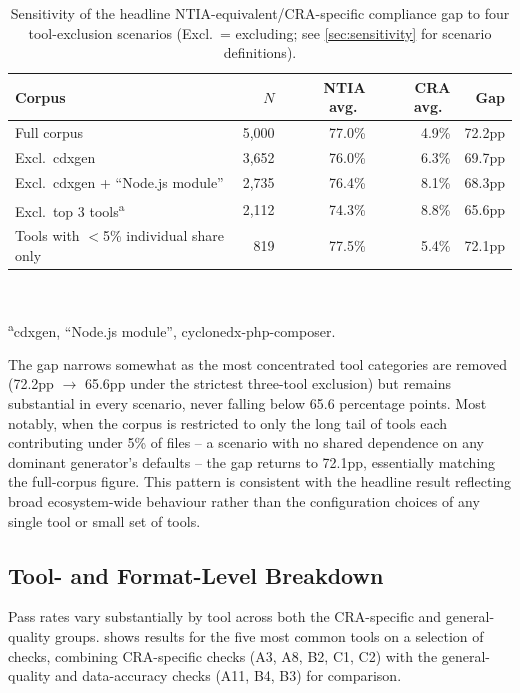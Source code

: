 \documentclass[11pt]{article}
\begin{document}
\begin{table}[t]
\centering
\caption{Sensitivity of the headline NTIA-equivalent/CRA-specific compliance gap to four tool-exclusion scenarios (Excl.\ = excluding; see \cref{sec:sensitivity} for scenario definitions).}
\label{tab:sensitivity}
\begin{tabular}{lrrrr}
\toprule
Corpus & $N$ & NTIA avg.\ & CRA avg.\ & Gap \\
\midrule
Full corpus & 5,000 & 77.0\% & 4.9\% & 72.2pp \\
Excl.\ cdxgen & 3,652 & 76.0\% & 6.3\% & 69.7pp \\
Excl.\ cdxgen + ``Node.js module'' & 2,735 & 76.4\% & 8.1\% & 68.3pp \\
Excl.\ top 3 tools\textsuperscript{a} & 2,112 & 74.3\% & 8.8\% & 65.6pp \\
Tools with $<$5\% individual share only & 819 & 77.5\% & 5.4\% & 72.1pp \\
\bottomrule
\end{tabular}
\\[2pt]
\raggedright\footnotesize\textsuperscript{a}cdxgen, ``Node.js module'', cyclonedx-php-composer.
\end{table}

The gap narrows somewhat as the most concentrated tool categories are removed (72.2pp $\rightarrow$ 65.6pp under the strictest three-tool exclusion) but remains substantial in every scenario, never falling below 65.6 percentage points. Most notably, when the corpus is restricted to only the long tail of tools each contributing under 5\% of files -- a scenario with no shared dependence on any dominant generator's defaults -- the gap returns to 72.1pp, essentially matching the full-corpus figure. This pattern is consistent with the headline result reflecting broad ecosystem-wide behaviour rather than the configuration choices of any single tool or small set of tools.

\subsection{Tool- and Format-Level Breakdown}
\label{sec:tool-format}

Pass rates vary substantially by tool across both the CRA-specific and general-quality groups.  shows results for the five most common tools on a selection of checks, combining CRA-specific checks (A3, A8, B2, C1, C2) with the general-quality and data-accuracy checks (A11, B4, B3) for comparison.
\end{document}
